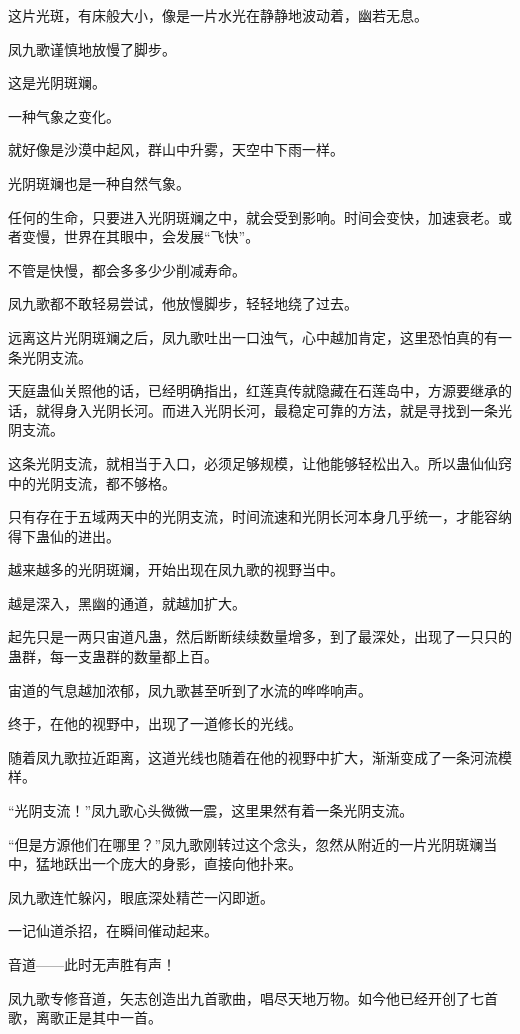 \begin{this_body}
这片光斑，有床般大小，像是一片水光在静静地波动着，幽若无息。

凤九歌谨慎地放慢了脚步。

这是光阴斑斓。

一种气象之变化。

就好像是沙漠中起风，群山中升雾，天空中下雨一样。

光阴斑斓也是一种自然气象。

任何的生命，只要进入光阴斑斓之中，就会受到影响。时间会变快，加速衰老。或者变慢，世界在其眼中，会发展“飞快”。

不管是快慢，都会多多少少削减寿命。

凤九歌都不敢轻易尝试，他放慢脚步，轻轻地绕了过去。

远离这片光阴斑斓之后，凤九歌吐出一口浊气，心中越加肯定，这里恐怕真的有一条光阴支流。

天庭蛊仙关照他的话，已经明确指出，红莲真传就隐藏在石莲岛中，方源要继承的话，就得身入光阴长河。而进入光阴长河，最稳定可靠的方法，就是寻找到一条光阴支流。

这条光阴支流，就相当于入口，必须足够规模，让他能够轻松出入。所以蛊仙仙窍中的光阴支流，都不够格。

只有存在于五域两天中的光阴支流，时间流速和光阴长河本身几乎统一，才能容纳得下蛊仙的进出。

越来越多的光阴斑斓，开始出现在凤九歌的视野当中。

越是深入，黑幽的通道，就越加扩大。

起先只是一两只宙道凡蛊，然后断断续续数量增多，到了最深处，出现了一只只的蛊群，每一支蛊群的数量都上百。

宙道的气息越加浓郁，凤九歌甚至听到了水流的哗哗响声。

终于，在他的视野中，出现了一道修长的光线。

随着凤九歌拉近距离，这道光线也随着在他的视野中扩大，渐渐变成了一条河流模样。

“光阴支流！”凤九歌心头微微一震，这里果然有着一条光阴支流。

“但是方源他们在哪里？”凤九歌刚转过这个念头，忽然从附近的一片光阴斑斓当中，猛地跃出一个庞大的身影，直接向他扑来。

凤九歌连忙躲闪，眼底深处精芒一闪即逝。

一记仙道杀招，在瞬间催动起来。

音道——此时无声胜有声！

凤九歌专修音道，矢志创造出九首歌曲，唱尽天地万物。如今他已经开创了七首歌，离歌正是其中一首。


\end{this_body}
